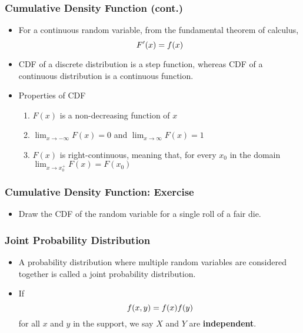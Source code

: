 \documentclass[pdflatex, 12pt]{beamer}
\begin{document}
\begin{frame}
\frametitle{Cumulative Density Function (cont.)}
\begin{itemize}
\item For a continuous random variable, from the fundamental theorem of calculus, 
 \begin{equation}
 F'(x) = f(x) \notag
 \end{equation}
\vspace{0.2cm}
\item CDF of a discrete distribution is a step function, whereas CDF of a continuous distribution is a continuous function.
\vspace{0.4cm}
\item Properties of CDF
 \begin{enumerate}
 \item $F(x)$ is a non-decreasing function of $x$
 \item $\lim_{x \to -\infty} F(x) = 0$ and $\lim_{x \to \infty} F(x) = 1$
 \item $F(x)$ is right-continuous, meaning that, for every $x_0$ in the domain $\lim_{x \to x_0^{+}} F(x) = F(x_0)$
 \end{enumerate}
\end{itemize}
\end{frame}

\begin{frame}
\frametitle{Cumulative Density Function: Exercise}
\begin{itemize}
\item Draw the CDF of the random variable for a single roll of a fair die.
\end{itemize}
\end{frame}

\begin{frame}
\frametitle{Joint Probability Distribution}
\begin{itemize}
\item A probability distribution where multiple random variables are considered together is called a joint probability distribution.
\vspace{0.4cm}
\item If
 \begin{equation}
 f(x, y) = f(x)f(y) \notag 
 \end{equation}
for all $x$ and $y$ in the support, we say $X$ and $Y$ are \textbf{independent}.
\end{itemize}
\end{frame}
\end{document}
